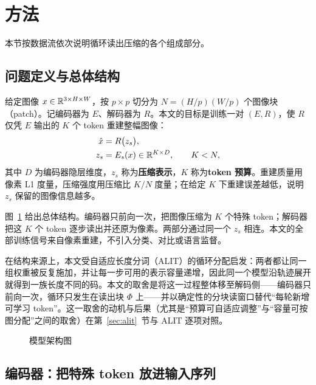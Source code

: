 \section{\heiti 方法}
\label{sec:method}

本节按数据流依次说明循环读出压缩的各个组成部分。

\subsection{\heiti 问题定义与总体结构}
\label{sec:problem}

给定图像 $x\in\mathbb{R}^{3\times H\times W}$，按 $p\times p$ 切分为 $N=(H/p)(W/p)$ 个图像块（patch）。记编码器为 $E$、解码器为 $R$。本文的目标是训练一对 $(E,R)$，使 $R$ 仅凭 $E$ 输出的 $K$ 个 token 重建整幅图像：
\begin{equation}
\begin{aligned}
\hat{x}&=R\big(z_s\big),\\
z_s&=E_s(x)\in\mathbb{R}^{K\times D},\qquad K<N,
\end{aligned}
\label{eq:goal}
\end{equation}
其中 $D$ 为编码器隐层维度，$z_s$ 称为\textbf{压缩表示}，$K$ 称为\textbf{token 预算}。重建质量用像素 L1 度量，压缩强度用压缩比 $K/N$ 度量；在给定 $K$ 下重建误差越低，说明 $z_s$ 保留的图像信息越多。

图~\ref{fig:arch} 给出总体结构。编码器只前向一次，把图像压缩为 $K$ 个特殊 token；解码器把这 $K$ 个 token 逐步读出并还原为像素。两部分通过同一个 $z_s$ 相连。本文的全部训练信号来自像素重建，不引入分类、对比或语言监督。

在结构来源上，本文受自适应长度分词（ALIT）的循环分配\cite{duggal2025alit}启发：两者都让同一组权重被反复施加，并让每一步可用的表示容量递增，因此同一个模型沿轨迹展开就得到一族长度不同的码。本文的取舍是将这一过程整体移至解码侧——编码器只前向一次，循环只发生在读出块 $\Phi$ 上——并以确定性的分块读窗口替代“每轮新增可学习 token”。这一取舍的动机与后果（尤其是“预算可自适应调整”与“容量可按图分配”之间的取舍）在第~\ref{sec:alit}~节与 ALIT 逐项对照。

\begin{figure}[t]
\centering
\resizebox{0.98\textwidth}{!}{%
%
}
\caption{模型架构图}
\label{fig:arch}
\end{figure}

\subsection{\heiti 编码器：把特殊 token 放进输入序列}
\label{sec:encoder}

